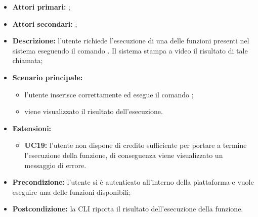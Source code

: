 \begin{itemize}
	\item \textbf{Attori primari:} \ua{};
	\item \textbf{Attori secondari:} \re{};
	\item \textbf{Descrizione:} l’utente richiede l’esecuzione di una delle funzioni presenti nel sistema eseguendo il comando \prun{}. Il sistema stampa a video il risultato di tale chiamata; 
	\item \textbf{Scenario principale:} 
	\begin{itemize}
		\item l'utente inserisce correttamente ed esegue il comando \prun{}; 
		\item viene visualizzato il risultato dell’esecuzione. 
	\end{itemize}
	\item \textbf{Estensioni:} 
	\begin{itemize}
		\item \textbf{UC19:} l’utente non dispone di credito sufficiente per portare a termine l’esecuzione della funzione, di conseguenza viene visualizzato un messaggio di errore.
	\end{itemize}
	\item \textbf{Precondizione:} l’utente si è autenticato all’interno della piattaforma e vuole eseguire una delle funzioni disponibili;
	\item \textbf{Postcondizione:} la CLI riporta il risultato dell’esecuzione della funzione. 
\end{itemize}